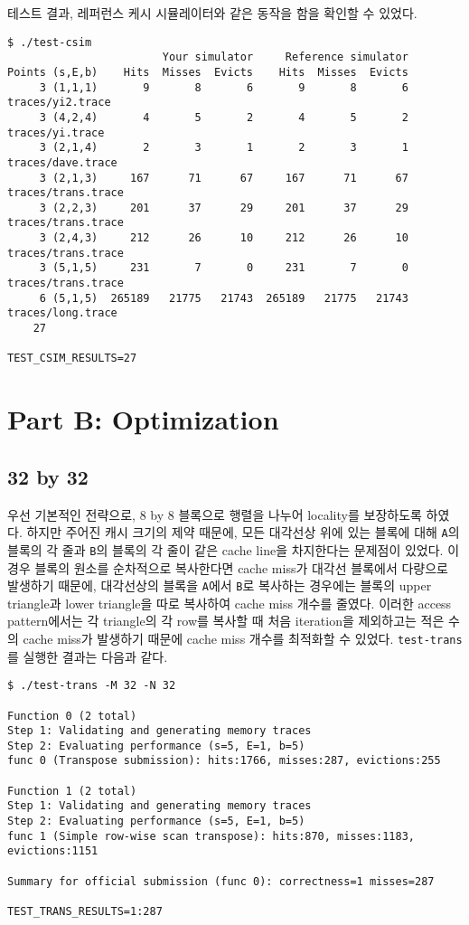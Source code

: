 \documentclass{scrartcl}
\begin{document}
테스트 결과, 레퍼런스 케시 시뮬레이터와 같은 동작을 함을 확인할 수 있었다.
\begin{lstlisting}
$ ./test-csim
                        Your simulator     Reference simulator
Points (s,E,b)    Hits  Misses  Evicts    Hits  Misses  Evicts
     3 (1,1,1)       9       8       6       9       8       6  traces/yi2.trace
     3 (4,2,4)       4       5       2       4       5       2  traces/yi.trace
     3 (2,1,4)       2       3       1       2       3       1  traces/dave.trace
     3 (2,1,3)     167      71      67     167      71      67  traces/trans.trace
     3 (2,2,3)     201      37      29     201      37      29  traces/trans.trace
     3 (2,4,3)     212      26      10     212      26      10  traces/trans.trace
     3 (5,1,5)     231       7       0     231       7       0  traces/trans.trace
     6 (5,1,5)  265189   21775   21743  265189   21775   21743  traces/long.trace
    27

TEST_CSIM_RESULTS=27
\end{lstlisting}

\section{Part B: Optimization}
\subsection{32 by 32}
우선 기본적인 전략으로, 8 by 8 블록으로 행렬을 나누어 locality를 보장하도록
하였다. 하지만 주어진 캐시 크기의 제약 때문에, 모든 대각선상 위에 있는 블록에
대해 \texttt{A}의 블록의 각 줄과 \texttt{B}의 블록의 각 줄이 같은 cache line을
차지한다는 문제점이 있었다. 이 경우 블록의 원소를 순차적으로 복사한다면 cache
miss가 대각선 블록에서 다량으로 발생하기 때문에, 대각선상의 블록을
\texttt{A}에서 \texttt{B}로 복사하는 경우에는 블록의 upper triangle과 lower
triangle을 따로 복사하여 cache miss 개수를 줄였다. 이러한 access pattern에서는
각 triangle의 각 row를 복사할 때 처음 iteration을 제외하고는 적은 수의 cache
miss가 발생하기 때문에 cache miss 개수를 최적화할 수 있었다.
\texttt{test-trans}를 실행한 결과는 다음과 같다.
\begin{lstlisting}
$ ./test-trans -M 32 -N 32

Function 0 (2 total)
Step 1: Validating and generating memory traces
Step 2: Evaluating performance (s=5, E=1, b=5)
func 0 (Transpose submission): hits:1766, misses:287, evictions:255

Function 1 (2 total)
Step 1: Validating and generating memory traces
Step 2: Evaluating performance (s=5, E=1, b=5)
func 1 (Simple row-wise scan transpose): hits:870, misses:1183, evictions:1151

Summary for official submission (func 0): correctness=1 misses=287

TEST_TRANS_RESULTS=1:287
\end{lstlisting}
\end{document}
